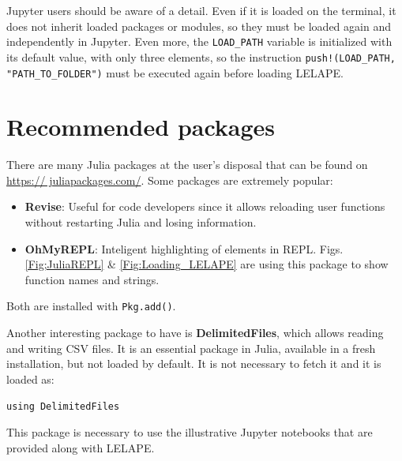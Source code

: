 Jupyter users should be aware of a detail. Even if it is loaded on the terminal, it does not inherit loaded packages or modules, so they must be loaded again and independently in Jupyter. Even more, the \texttt{LOAD\_PATH} variable is initialized with its default value, with only three elements, so the instruction \texttt{push!(LOAD\_PATH, "PATH\_TO\_FOLDER")} must be executed again before loading LELAPE.

\section{Recommended packages}
%
There are many Julia packages at the user's disposal that can be found on \href{https://juliapackages.com/}{https:// juliapackages.com/}. Some packages are extremely popular:
\begin{itemize}
	\item \textbf{Revise}: Useful for code developers since it allows reloading user functions without restarting Julia and losing information.
	\item \textbf{OhMyREPL}: Inteligent highlighting of elements in REPL. Figs. \ref{Fig;JuliaREPL} \& \ref{Fig:Loading_LELAPE} are using this package to show function names and strings.
\end{itemize}

Both are installed with \texttt{Pkg.add()}. 

Another interesting package to have is \textbf{DelimitedFiles}, which allows reading and writing CSV files. It is an essential package in Julia, available in a fresh installation, but not loaded by default. It is not necessary to fetch it and it is loaded as:
	
\vspace{1mm}
\begin{center}
	\texttt{using DelimitedFiles}
\end{center}
\vspace{1mm}	

This package is necessary to use the illustrative Jupyter notebooks that are provided along with LELAPE.

